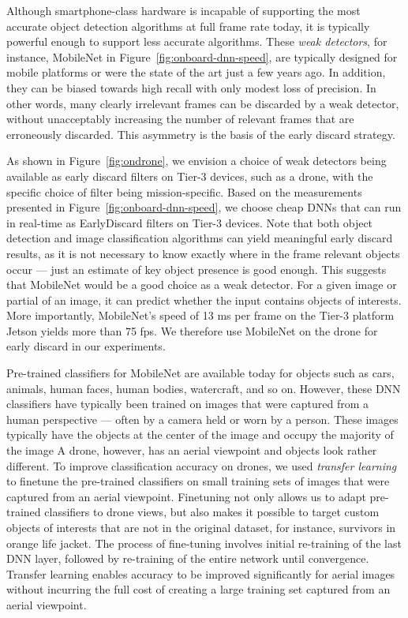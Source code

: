 Although smartphone-class hardware is incapable of supporting the most accurate
object detection algorithms at full frame rate today, it is typically powerful
enough to support less accurate algorithms.  These {\em weak detectors}, for
instance, MobileNet in Figure~\ref{fig:onboard-dnn-speed}, are typically
designed for mobile platforms or were the state of the art just a few years ago.
In addition, they can be biased towards high recall with only modest loss of
precision. In other words, many clearly irrelevant frames can be discarded by a
weak detector, without unacceptably increasing the number of relevant frames
that are erroneously discarded.  This asymmetry is the basis of the early
discard strategy.

As shown in Figure~\ref{fig:ondrone}, we envision a choice of weak detectors
being available as early discard filters on Tier-3 devices, such as a drone,
with the specific choice of filter being mission-specific.  Based on the
measurements presented in Figure~\ref{fig:onboard-dnn-speed}, we choose cheap
DNNs that can run in real-time as EarlyDiscard filters on Tier-3 devices. Note
that both object detection and image classification algorithms can yield
meaningful early discard results, as it is not necessary to know exactly where
in the frame relevant objects occur --- just an estimate of key object presence
is good enough. This suggests that MobileNet would be a good choice as a weak
detector. For a given image or partial of an image, it can predict whether the
input contains objects of interests. More importantly, MobileNet's speed of 13
ms per frame on the Tier-3 platform Jetson yields more than 75 fps. We therefore
use MobileNet on the drone for early discard in our experiments.

Pre-trained classifiers for MobileNet are available today for objects such as
cars, animals, human faces, human bodies, watercraft, and so on.  However, these
DNN classifiers have typically been trained on images that were captured from a
human perspective --- often by a camera held or worn by a person. These images
typically have the objects at the center of the image and occupy the majority of
the image A drone, however, has an aerial viewpoint and objects look rather
different.  To improve classification accuracy on drones, we used {\em transfer
learning}~\cite{Yosinski2014} to finetune the pre-trained classifiers on small
training sets of images that were captured from an aerial viewpoint. Finetuning
not only allows us to adapt pre-trained classifiers to drone views, but also
makes it possible to target custom objects of interests that are not in the
original dataset, for instance, survivors in orange life jacket. The process of
fine-tuning involves initial re-training of the last DNN layer, followed by
re-training of the entire network until convergence. Transfer learning enables
accuracy to be improved significantly for aerial images without incurring the
full cost of creating a large training set captured from an aerial viewpoint.

